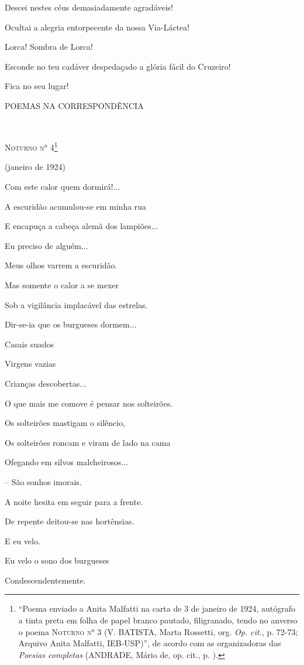 Descei nestes céus demasiadamente agradáveis!

Ocultai a alegria entorpecente da nossa Via-Láctea!

Lorca! Sombra de Lorca!

Esconde no teu cadáver despedaçado a glória fácil do Cruzeiro!

Fica no seu lugar!

\textsc{POEMAS NA CORRESPONDÊNCIA}

\textsc{\\
}

\textsc{Noturno n° 4}\footnote{``Poema enviado a Anita Malfatti na carta
  de 3 de janeiro de 1924, autógrafo a tinta preta em folha de papel
  branco pautado, filigranado, tendo no anverso o poema \textsc{Noturno
  n° 3} (V. BATISTA, Marta Rossetti, org. \emph{Op. cit.}, p. 72-73;
  Arquivo Anita Malfatti, IEB-USP)'', de acordo com as organizadoras das
  \emph{Poesias completas} (ANDRADE, Mário de, op. cit., p. ).}

(janeiro de 1924)

Com este calor quem dormirá!...

A escuridão acumulou-se em minha rua

E encapuça a cabeça alemã dos lampiões...

Eu preciso de alguém...

Meus olhos varrem a escuridão.

Mas somente o calor a se mexer

Sob a vigilância implacável das estrelas.

Dir-se-ia que os burgueses dormem...

Casais suados

Virgens vazias

Crianças descobertas...

O que mais me comove é pensar nos solteirões.

Os solteirões mastigam o silêncio,

Os solteirões roncam e viram de lado na cama

Ofegando em silvos malcheirosos...

-- São sonhos imorais.

A noite hesita em seguir para a frente.

De repente deitou-se nas hortênsias.

E eu velo.

Eu velo o sono dos burgueses

Condescendentemente.

